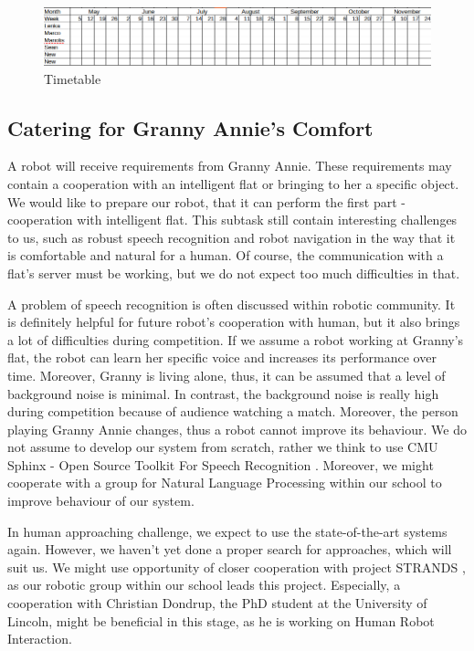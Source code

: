 \documentclass[conference]{IEEEtran}
\begin{document}
\begin{figure}[!htb]
\centering
\includegraphics[width=\textwidth]{timetable.png}
\caption{Timetable}
\label{fig:plan}
\end{figure}

\subsection{Catering for Granny Annie’s Comfort}

A robot will receive requirements from Granny Annie. These requirements may contain a cooperation with an intelligent flat or bringing to her a specific object. We would like to prepare our robot, that it can perform the first part - cooperation with intelligent flat. This subtask still contain interesting challenges to us, such as robust speech recognition and robot navigation in the way that it is comfortable and natural for a human. Of course, the communication with a flat's server must be working, but we do not expect too much difficulties in that. 

A problem of speech recognition is often discussed within robotic community. It is definitely helpful for future robot's cooperation with human, but it also brings a lot of difficulties during competition. If we assume a robot working at Granny's flat, the robot can learn her specific voice and increases its performance over time. Moreover, Granny is living alone, thus, it can be assumed that a level of background noise is minimal. In contrast, the background noise is really high during competition because of audience watching a match. Moreover, the person playing Granny Annie changes, thus a robot cannot improve its behaviour. We do not assume to develop our system from scratch, rather we think to use CMU Sphinx - Open Source Toolkit For Speech Recognition \cite{cmu}. Moreover, we might cooperate with a group for Natural Language Processing within our school to improve behaviour of our system.

In human approaching challenge, we expect to use the state-of-the-art systems again. However, we haven't yet done a proper search for approaches, which will suit us. We might use opportunity of closer cooperation with project STRANDS \cite{strands}, as our robotic group within our school leads this project. Especially, a cooperation with Christian Dondrup, the PhD student at the University of Lincoln, might be beneficial in this stage, as he is working on Human Robot Interaction.
\end{document}
